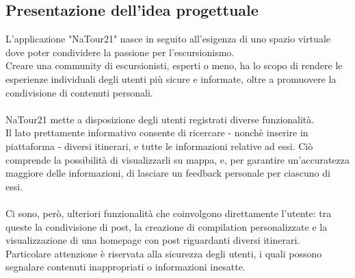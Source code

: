 \documentclass{natourDoc}
\begin{document}
	\subsection{Presentazione dell'idea progettuale}

	L'applicazione "NaTour21" nasce in seguito all'esigenza di uno spazio virtuale dove poter condividere la passione per l'escursionismo.\\
	Creare una community di escursionisti, esperti o meno, ha lo scopo di rendere le esperienze individuali degli utenti più sicure e informate, 
	oltre a promuovere la condivisione di contenuti personali.\\\\
	NaTour21 mette a disposizione degli utenti registrati diverse funzionalità.\\
	Il lato prettamente informativo consente di ricercare - nonchè inserire in piattaforma - diversi itinerari, e tutte le informazioni relative ad essi.
	Ciò comprende la possibilità di visualizzarli su mappa, e, per garantire un'accuratezza maggiore delle informazioni, di lasciare 
	un feedback personale per ciascuno di essi.\\\\
	Ci sono, però, ulteriori funzionalità che coinvolgono direttamente l'utente: tra queste la condivisione di post, la creazione di compilation personalizzate e 
	la visualizzazione di una homepage con post riguardanti diversi itinerari.\\
	Particolare attenzione è riservata alla sicurezza degli utenti, i quali possono segnalare contenuti inappropriati o informazioni inesatte.
	
\end{document}
